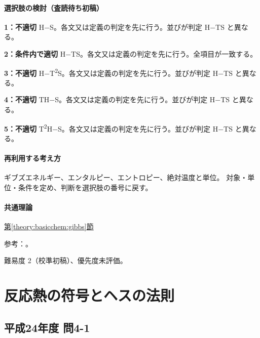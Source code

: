 \paragraph{選択肢の検討（査読待ち初稿）}\mbox{}\par

\noindent\textbf{1：不適切} H−S。各文又は定義の判定を先に行う。並びが判定 H−TS と異なる。\par

\noindent\textbf{2：条件内で適切} H−TS。各文又は定義の判定を先に行う。全項目が一致する。\par

\noindent\textbf{3：不適切} H−T\textsuperscript{2}S。各文又は定義の判定を先に行う。並びが判定 H−TS と異なる。\par

\noindent\textbf{4：不適切} TH−S。各文又は定義の判定を先に行う。並びが判定 H−TS と異なる。\par

\noindent\textbf{5：不適切} T\textsuperscript{2}H−S。各文又は定義の判定を先に行う。並びが判定 H−TS と異なる。\par

\paragraph{再利用する考え方} ギブズエネルギー、エンタルピー、エントロピー、絶対温度と単位。 対象・単位・条件を定め、判断を選択肢の番号に戻す。

\paragraph{共通理論} \hyperref[theory:basicchem:gibbs]{第\ref*{theory:basicchem:gibbs}節}

\par 参考：\cite{chem55_gibbs}。

\par 難易度 2（校準初稿）、優先度未評価。

\section{反応熱の符号とヘスの法則}

\subsection{平成24年度 問4-1}
\label{q:h24-reg-basic-4-1}


